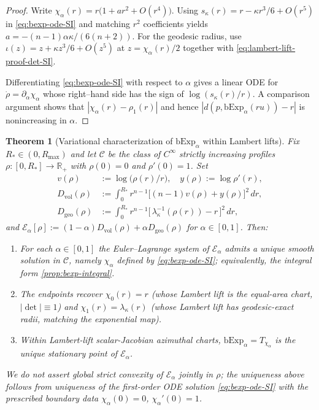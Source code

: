 \documentclass{article}
\newtheorem{theorem}{Theorem}
\theoremstyle{definition}
\theoremstyle{remark}
\newcommand{\bExp}{\mathrm{bExp}}
\newcommand{\ars}{\iota}  %
\begin{document}
\begin{proof}
Write $\chi_\alpha(r)=r\bigl(1+a r^2+O(r^4)\bigr)$. Using
$s_\kappa(r)=r-\kappa r^3/6+O(r^5)$ in \eqref{eq:bexp-ode-SI} and matching $r^2$ coefficients yields
$a=-(n-1)\alpha\kappa/(6(n+2))$. For the geodesic radius, use
$\ars(z)=z+\kappa z^3/6+O(z^5)$ at $z=\chi_\alpha(r)/2$ together with
\eqref{eq:lambert-lift-proof-det-SI}.

Differentiating \eqref{eq:bexp-ode-SI} with respect to $\alpha$ gives a linear ODE for
$\dot\rho=\partial_\alpha\chi_\alpha$ whose right--hand side has the sign of $\log(s_\kappa(r)/r)$.
A comparison argument shows that $|\chi_\alpha(r)-\rho_1(r)|$ and hence
$|d(p,\mathrm{bExp}_\alpha(ru))-r|$ is nonincreasing in $\alpha$.
\end{proof}
\begin{theorem}[Variational characterization of $\bExp_\alpha$ within Lambert lifts]
\label{thm:bexp-variational}
Fix $R_*\in(0,R_{\max})$ and let $\mathcal C$ be the class of $C^\infty$
strictly increasing profiles $\rho:[0,R_*]\to\mathbb R_+$ with $\rho(0)=0$
and $\rho'(0)=1$. Set
\begin{align*}
v(\rho)&:=\log\bigl(\rho(r)/r\bigr),\quad y(\rho):=\log\rho'(r),\\
D_{\mathrm{vol}}(\rho)&:=\int_0^{R_*}\! r^{n-1}\bigl[(n-1)v(\rho)+y(\rho)\bigr]^2\,dr,\\
D_{\mathrm{geo}}(\rho)&:=\int_0^{R_*}\! r^{n-1}\bigl[\,\lambda_\kappa^{-1}(\rho(r))-r\,\bigr]^2\,dr,
\end{align*}
and $\mathcal E_\alpha[\rho]:=(1-\alpha)D_{\mathrm{vol}}(\rho)+\alpha D_{\mathrm{geo}}(\rho)$
for $\alpha\in[0,1]$. Then:
\begin{enumerate}
\item For each $\alpha\in[0,1]$ the Euler--Lagrange system of $\mathcal E_\alpha$
admits a unique smooth solution in $\mathcal C$, namely $\chi_\alpha$ defined by
\eqref{eq:bexp-ode-SI}; equivalently, the integral form \eqref{prop:bexp-integral}.
\item The endpoints recover $\chi_0(r)=r$ (whose Lambert lift is the equal-area chart, $|\det|\equiv1$) and
$\chi_1(r)=\lambda_\kappa(r)$ (whose Lambert lift has geodesic-exact radii, matching the exponential map).
\item Within Lambert-lift scalar-Jacobian azimuthal charts, $\bExp_\alpha=T_{\chi_\alpha}$
is the unique stationary point of $\mathcal E_\alpha$.
\end{enumerate}
We do not assert global strict convexity of $\mathcal E_\alpha$ jointly in $\rho$;
the uniqueness above follows from uniqueness of the first-order ODE solution
\eqref{eq:bexp-ode-SI} with the prescribed boundary data $\chi_\alpha(0)=0$,
$\chi_\alpha'(0)=1$.
\end{theorem}
\end{document}
